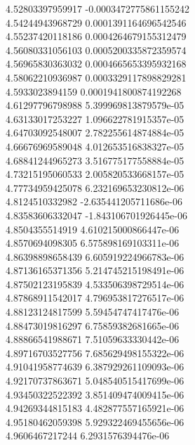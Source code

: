 {4.52803397959917 -0.0003472775861155242 \\
4.54244943968729 0.0001391164696542546 \\
4.55237420118186 0.0004264679155312479 \\
4.56080331056103 0.0005200335872359574 \\
4.56965830363032 0.0004665653395932168 \\
4.58062210936987 0.0003329117898829281 \\
4.5933023894159 0.0001941800874192268 \\
4.61297796798988 5.399969813879579e-05 \\
4.63133017253227 1.096622781915357e-05 \\
4.64703092548007 2.782255614874884e-05 \\
4.66676969589048 4.012653516838327e-05 \\
4.68841244965273 3.516775177558884e-05 \\
4.73215195060533 2.005820533668157e-05 \\
4.77734959425078 6.232169653230812e-06 \\
4.8124510332982 -2.635441205711686e-06 \\
4.83583606332047 -1.843106701926445e-06 \\
4.8504355514919 4.610215000866447e-06 \\
4.8570694098305 6.575898169103311e-06 \\
4.86398898658439 6.605919224966783e-06 \\
4.87136165371356 5.214745215198491e-06 \\
4.87502123195839 4.533506398729514e-06 \\
4.87868911542017 4.796953817276517e-06 \\
4.88123124817599 5.59454747417476e-06 \\
4.88473019816297 6.75859382681665e-06 \\
4.88866541988671 7.51059633330442e-06 \\
4.89716703527756 7.685629498155322e-06 \\
4.91041958774639 6.387929261109093e-06 \\
4.92170737863671 5.048540515417699e-06 \\
4.93450322522392 3.851409474009415e-06 \\
4.94269344815183 4.482877557165921e-06 \\
4.95180462059398 5.929322469455656e-06 \\
4.9606467217244 6.2931576394476e-06 \\
}
